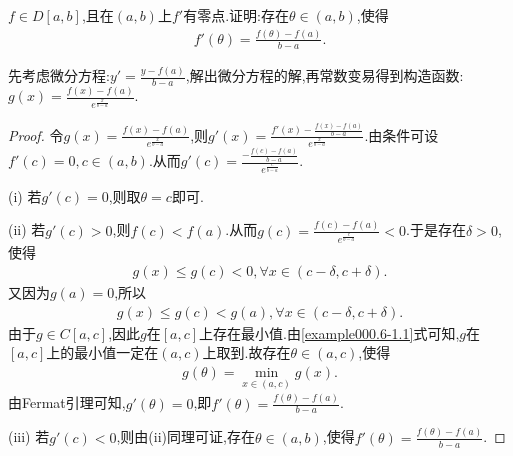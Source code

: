 \documentclass[../../main.tex]{subfiles}
\begin{document}
\begin{example}
$f\in D[a,b]$,且在$(a,b)$上$f'$有零点.证明:存在$\theta \in (a,b)$,使得
\begin{align*}
f'(\theta) = \frac{f(\theta) -f(a)}{b-a}.
\end{align*}
\end{example}
\begin{remark}
先考虑微分方程:$y' =\frac{y-f(a)}{b-a}$,解出微分方程的解,再常数变易得到构造函数:$g(x) =\frac{f(x) -f(a)}{e^{\frac{x}{b-a}}}$.
\end{remark}
\begin{proof}
令$g(x) =\frac{f(x) -f(a)}{e^{\frac{x}{b-a}}}$,则$g'(x) =\frac{f'(x) -\frac{f(x) -f(a)}{b-a}}{e^{\frac{x}{b-a}}}$.由条件可设$f'(c) =0,c\in (a,b)$.从而$g'(c) =\frac{-\frac{f(c) -f(a)}{b-a}}{e^{\frac{c}{b-a}}}$.

(i) 若$g'(c) =0$,则取$\theta =c$即可.

(ii) 若$g'(c) >0$,则$f(c) <f(a)$.从而$g(c) =\frac{f(c) -f(a)}{e^{\frac{c}{b-a}}}<0$.于是存在$\delta >0$,使得
\begin{align*}
g(x) \leqslant g(c) <0,\forall x\in (c-\delta ,c+\delta).
\end{align*}
又因为$g(a) =0$,所以
\begin{align}
g(x) \leqslant g(c) <g(a),\forall x\in (c-\delta ,c+\delta).\label{example000.6-1.1}
\end{align}
由于$g\in C[a,c]$,因此$g$在$[a,c]$上存在最小值.由\eqref{example000.6-1.1}式可知,$g$在$[a,c]$上的最小值一定在$(a,c)$上取到.故存在$\theta \in (a,c)$,使得
\begin{align*}
g(\theta) =\min_{x\in (a,c)}g(x).
\end{align*}
由Fermat引理可知,$g'(\theta) =0$,即$f'(\theta) =\frac{f(\theta) -f(a)}{b-a}$.

(iii) 若$g'(c) <0$,则由(ii)同理可证,存在$\theta \in (a,b)$,使得$f'(\theta) =\frac{f(\theta) -f(a)}{b-a}$.
\end{proof}
\end{document}
